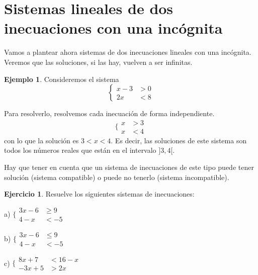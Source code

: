 \documentclass[13pt]{scrartcl}
\theoremstyle{definition}
\newtheorem{ejemplo}{Ejemplo}
\newtheorem{ejercicio}{Ejercicio}
\begin{document}
\section{Sistemas lineales de dos inecuaciones con una incógnita}

Vamos a plantear ahora sistemas de dos inecuaciones lineales con una incógnita. Veremos que 
las soluciones, si las hay, vuelven a ser infinitas.

\begin{ejemplo} Consideremos el sistema 
\[
\left\{ 
\begin{aligned} x-3 &>0 \\
              2x & < 8 
\end{aligned}
\right.
\]

Para resolverlo, resolvemos cada inecuación de forma independiente.
\[
\Biggr\{
\begin{aligned}
 x & >3 \\
 x & <4 
\end{aligned}
\]
con lo que la solución es  $3 < x <4$. Es decir, las soluciones de este sistema son todos los números reales que están en el intervalo $]3,4[$.

Hay que tener en cuenta que un sistema de inecuaciones de este tipo puede tener solución (sistema compatible) o puede no tenerlo (sistema incompatible).
\end{ejemplo}

\begin{ejercicio} Resuelve los siguientes sistemas de inecuaciones:
\begin{multicols}{3}
\item[a)]$\Biggr\{ \begin{aligned}  3x-6 & \ge 9 \\
                                        4-x & < -5 \end{aligned} $
\item[b)] $\Biggr\{ \begin{aligned} 3x-6 & \le 9 \\
                                      4-x & < -5 \end{aligned} $
\item[c)] $\Biggr\{ \begin{aligned} 8x+7 & < 16-x \\
                                      -3x+5 & >2x \end{aligned} $
\end{multicols}
\end{ejercicio}
\end{document}
